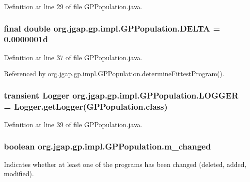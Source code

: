 Definition at line 29 of file G\-P\-Population.\-java.

\hypertarget{classorg_1_1jgap_1_1gp_1_1impl_1_1_g_p_population_ab8c06531dff207ecdff0c86b3d36651e}{
\subsubsection[{D\-E\-L\-T\-A}]{\setlength{\rightskip}{0pt plus 5cm}final double org.\-jgap.\-gp.\-impl.\-G\-P\-Population.\-D\-E\-L\-T\-A = 0.\-0000001d\hspace{0.3cm}{\ttfamily [static]}}}\label{classorg_1_1jgap_1_1gp_1_1impl_1_1_g_p_population_ab8c06531dff207ecdff0c86b3d36651e}


Definition at line 37 of file G\-P\-Population.\-java.



Referenced by org.\-jgap.\-gp.\-impl.\-G\-P\-Population.\-determine\-Fittest\-Program().

\hypertarget{classorg_1_1jgap_1_1gp_1_1impl_1_1_g_p_population_a2e511782d083ba5853395ac9cb59b95a}{
\subsubsection[{L\-O\-G\-G\-E\-R}]{\setlength{\rightskip}{0pt plus 5cm}transient Logger org.\-jgap.\-gp.\-impl.\-G\-P\-Population.\-L\-O\-G\-G\-E\-R = Logger.\-get\-Logger(G\-P\-Population.\-class)\hspace{0.3cm}{\ttfamily [private]}}}\label{classorg_1_1jgap_1_1gp_1_1impl_1_1_g_p_population_a2e511782d083ba5853395ac9cb59b95a}


Definition at line 39 of file G\-P\-Population.\-java.

\hypertarget{classorg_1_1jgap_1_1gp_1_1impl_1_1_g_p_population_a4454c7e30fa80ed50d68c9e06b7f6897}{
\subsubsection[{m\-\_\-changed}]{\setlength{\rightskip}{0pt plus 5cm}boolean org.\-jgap.\-gp.\-impl.\-G\-P\-Population.\-m\-\_\-changed\hspace{0.3cm}{\ttfamily [private]}}}\label{classorg_1_1jgap_1_1gp_1_1impl_1_1_g_p_population_a4454c7e30fa80ed50d68c9e06b7f6897}
Indicates whether at least one of the programs has been changed (deleted, added, modified). 

